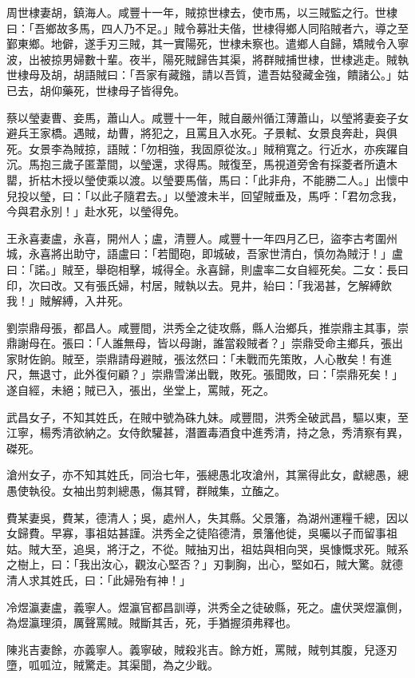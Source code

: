 \begin{pinyinscope}
周世棣妻胡，鎮海人。咸豐十一年，賊掠世棣去，使市馬，以三賊監之行。世棣曰：「吾鄉故多馬，四人乃不足。」賊令募壯夫偕，世棣得鄉人同陷賊者六，導之至鄞東鄉。地僻，遂手刃三賊，其一實陽死，世棣未察也。遣鄉人自歸，矯賊令入寧波，出被掠男婦數十輩。夜半，陽死賊歸告其渠，將群賊捕世棣，世棣逃走。賊執世棣母及胡，胡語賊曰：「吾家有藏鏹，請以吾質，遣吾姑發藏金強，饋諸公。」姑已去，胡仰藥死，世棣母子皆得免。

蔡以瑩妻曹、妾馬，蕭山人。咸豐十一年，賊自嚴州循江薄蕭山，以瑩將妻妾子女避兵王家橋。遇賊，劫曹，將犯之，且罵且入水死。子景軾、女景良奔赴，與俱死。女景李為賊掠，語賊：「勿相強，我固原從汝。」賊稍寬之。行近水，亦疾躍自沉。馬抱三歲子匿葦間，以瑩還，求得馬。賊復至，馬視道旁舍有採菱者所遺木罌，折枯木授以瑩使乘以渡。以瑩要馬偕，馬曰：「此非舟，不能勝二人。」出懷中兒投以瑩，曰：「以此子隨君去。」以瑩渡未半，回望賊垂及，馬呼：「君勿念我，今與君永別！」赴水死，以瑩得免。

王永喜妻盧，永喜，開州人；盧，清豐人。咸豐十一年四月乙巳，盜李古考圍州城，永喜將出助守，語盧曰：「若聞砲，即城破，吾家世清白，慎勿為賊汙！」盧曰：「諾。」賊至，舉砲相擊，城得全。永喜歸，則盧率二女自經死矣。二女：長曰印，次曰改。又有張氏婦，村居，賊執以去。見井，紿曰：「我渴甚，乞解縛飲我！」賊解縛，入井死。

劉崇鼎母張，都昌人。咸豐間，洪秀全之徒攻縣，縣人治鄉兵，推崇鼎主其事，崇鼎謝母在。張曰：「人誰無母，皆以母謝，誰當殺賊者？」崇鼎受命主鄉兵，張出家財佐餉。賊至，崇鼎請母避賊，張泫然曰：「未戰而先策敗，人心散矣！有進尺，無退寸，此外復何顧？」崇鼎雪涕出戰，敗死。張聞敗，曰：「崇鼎死矣！」遂自經，未絕；賊已入，張出，坐堂上，罵賊，死之。

武昌女子，不知其姓氏，在賊中號為硃九妹。咸豐間，洪秀全破武昌，驅以東，至江寧，楊秀清欲納之。女侍飲驩甚，潛置毒酒食中進秀清，持之急，秀清察有異，磔死。

滄州女子，亦不知其姓氏，同治七年，張總愚北攻滄州，其黨得此女，獻總愚，總愚使執役。女袖出剪刺總愚，傷其臂，群賊集，立醢之。

費某妻吳，費某，德清人；吳，處州人，失其縣。父景籓，為湖州運糧千總，因以女歸費。早寡，事祖姑甚謹。洪秀全之徒陷德清，景籓他徙，吳囑以子而留事祖姑。賊大至，追吳，將汙之，不從。賊抽刃出，祖姑與相向哭，吳慷慨求死。賊系之樹上，曰：「我出汝心，觀汝心堅否？」刃剚胸，出心，堅如石，賊大驚。就德清人求其姓氏，曰：「此婦殆有神！」

冷煜瀛妻盧，義寧人。煜瀛官都昌訓導，洪秀全之徒破縣，死之。盧伏哭煜瀛側，為煜瀛理須，厲聲罵賊。賊斷其舌，死，手猶握須弗釋也。

陳兆吉妻餘，亦義寧人。義寧破，賊殺兆吉。餘方姙，罵賊，賊刳其腹，兒逐刃墮，呱呱泣，賊驚走。其渠聞，為之少戢。


\end{pinyinscope}
